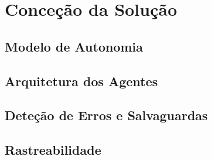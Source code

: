 \chapter{Conceção da Solução}
\label{chap:concecao}

\section{Modelo de Autonomia}
\label{sec:concecao_autonomia}

\section{Arquitetura dos Agentes}
\label{sec:concecao_arquitetura}

\section{Deteção de Erros e Salvaguardas}
\label{sec:concecao_salvaguardas}

\section{Rastreabilidade}
\label{sec:concecao_rastreabilidade}
